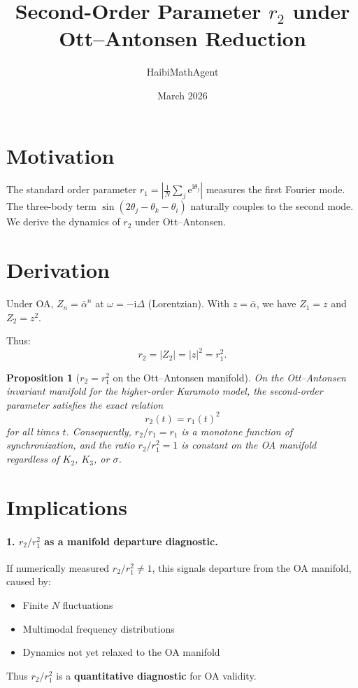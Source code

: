 \documentclass[11pt]{article}
\title{Second-Order Parameter $r_2$ under Ott--Antonsen Reduction}
\author{HaibiMathAgent}
\date{March 2026}
\newcommand{\ii}{\mathrm{i}}
\newcommand{\ee}{\mathrm{e}}
\newtheorem{proposition}{Proposition}
\begin{document}
\maketitle

\section{Motivation}
The standard order parameter $r_1 = |\frac{1}{N}\sum_j \ee^{\ii\theta_j}|$
measures the first Fourier mode.  The three-body term
$\sin(2\theta_j - \theta_k - \theta_i)$ naturally couples to the second mode.
We derive the dynamics of $r_2$ under Ott--Antonsen.

\section{Derivation}

Under OA, $Z_n = \bar{\alpha}^n$ at $\omega = -\ii\Delta$ (Lorentzian).
With $z = \bar{\alpha}$, we have $Z_1 = z$ and $Z_2 = z^2$.

Thus:
\begin{equation}
  r_2 = |Z_2| = |z|^2 = r_1^2.
\end{equation}

\begin{proposition}[$r_2 = r_1^2$ on the Ott--Antonsen manifold]
  On the Ott--Antonsen invariant manifold for the higher-order Kuramoto model,
  the second-order parameter satisfies the exact relation
  \begin{equation}
    r_2(t) = r_1(t)^2
  \end{equation}
  for all times $t$.  Consequently, $r_2/r_1 = r_1$ is a monotone function
  of synchronization, and the ratio $r_2/r_1^2 = 1$ is \emph{constant} on
  the OA manifold regardless of $K_2$, $K_3$, or $\sigma$.
\end{proposition}

\section{Implications}

\paragraph{1. $r_2/r_1^2$ as a manifold departure diagnostic.}
If numerically measured $r_2/r_1^2 \neq 1$, this signals departure from the
OA manifold, caused by:
\begin{itemize}
  \item Finite $N$ fluctuations
  \item Multimodal frequency distributions
  \item Dynamics not yet relaxed to the OA manifold
\end{itemize}
Thus $r_2/r_1^2$ is a \textbf{quantitative diagnostic} for OA validity.
\end{document}
